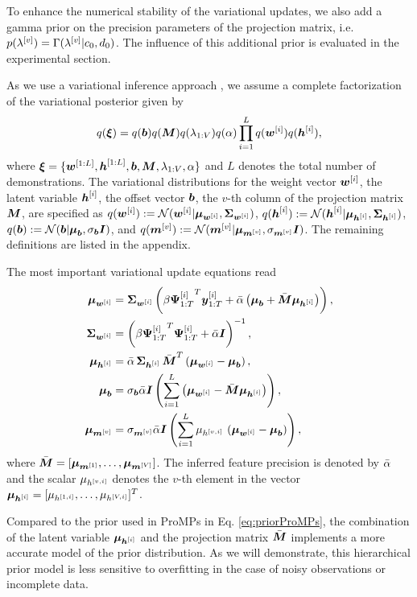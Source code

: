 To enhance the numerical stability of the variational updates, we also 
add a gamma prior on the precision parameters of the projection matrix, i.e. $p(\lv)=\Gamma(\lv|c_0,d_0)$. 
The influence of this additional prior is evaluated in the experimental section. 

As we use a variational inference approach \cite{bishop06}, we assume a complete factorization of the variational posterior given by
\begin{align*}
 q(\vec \xi) = q(\wo) q(\WV) q(\lambda_{1:V}) q(\alpha) \prod_{i=1}^L q(\wi) q(\hi) ,
\end{align*}
where $\vec \xi=\{\vec w^{[1:L]}, \vec h^{[1:L]}, \wo, \WV, \lambda_{1:V}, \alpha \}$  
and $L$ denotes the total number of demonstrations. 
The variational distributions for 
the weight vector $\wi$, 
the latent variable $\hi$, 
the offset vector $\wo$, 
the $v$-th column of the projection matrix $\WV$, 
are specified as 
$q(\wi) := \N(\wi| \Vwi, \VSi)$,
$q(\hi) := \N(\hi| \Vhi, \Vgi)$, 
$q(\wo) := \N(\wo| \Vwo, \Vlo \vec I)$, and 
$q(\wv) := \N(\wv| \Vwv, \Vlv \vec I)$. 
The remaining definitions are listed in the appendix. 

The most important variational update equations read
\begin{align*}
 \Vwi &= \VSi \left( \beta {\vec \Psi_{1:T}^{[i]}}^T \vec y_{1:T}^{[i]} +
\ValphaN \left(\Vwo + \VWV \Vhi\right)\right), \\
 \VSi &= \left(\beta {\vec \Psi_{1:T}^{[i]}}^T \vec \Psi_{1:T}^{[i]} + \ValphaN
\vec I\right)^{-1}, \\
 \Vhi &= \ValphaN \, \Vgi \, \VWV^T  \left(\Vwi - \Vwo\right), \\
\Vwo &= \Vlo \ValphaN \vec I \left(\sum_{i=1}^L \left(\Vwi - \VWV
\Vhi\right)\right), \\
\Vwv &= \Vlv \ValphaN \vec I \left(\sum_{i=1}^L \Vhiv \, \left(\Vwi -
\Vwo\right)\right),
\end{align*}
where $\VWV = [\Vwvel{1}, \dots, \Vwvel{V}]$. 
The inferred feature precision is denoted by $\ValphaN$ and 
the scalar $\Vhiv$ denotes the $v$-th element in the vector $\Vhi = [\Vhivel{1}, \dots, \Vhivel{V}]^T$.

Compared to the prior used in ProMPs in Eq. \eqref{eq:priorProMPs}, 
the combination of the latent variable $\Vhi$ 
and the projection matrix $\VWV$ implements 
a more accurate model of the prior distribution.  
As we will demonstrate, this hierarchical prior model is 
less sensitive to overfitting in the case of noisy observations 
or incomplete data. 

